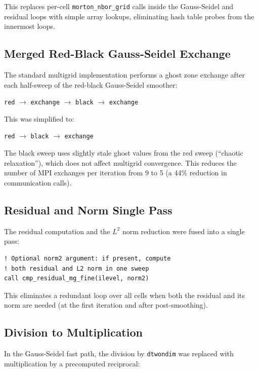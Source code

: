 \documentclass[11pt,fleqn]{book}
\begin{document}
This replaces per-cell \texttt{morton\_nbor\_grid} calls inside the Gauss-Seidel and residual loops with simple array lookups, eliminating hash table probes from the innermost loops.

\subsection{Merged Red-Black Gauss-Seidel Exchange}

The standard multigrid implementation performs a ghost zone exchange after each half-sweep of the red-black Gauss-Seidel smoother:
\begin{center}
\texttt{red} $\to$ \texttt{exchange} $\to$ \texttt{black} $\to$ \texttt{exchange}
\end{center}

This was simplified to:
\begin{center}
\texttt{red} $\to$ \texttt{black} $\to$ \texttt{exchange}
\end{center}

The black sweep uses slightly stale ghost values from the red sweep (``chaotic relaxation''), which does not affect multigrid convergence. This reduces the number of MPI exchanges per iteration from 9 to 5 (a 44\% reduction in communication calls).

\subsection{Residual and Norm Single Pass}

The residual computation and the $L^2$ norm reduction were fused into a single pass:

\begin{lstlisting}[style=fortran,numbers=none]
! Optional norm2 argument: if present, compute
! both residual and L2 norm in one sweep
call cmp_residual_mg_fine(ilevel, norm2)
\end{lstlisting}

This eliminates a redundant loop over all cells when both the residual and its norm are needed (at the first iteration and after post-smoothing).

\subsection{Division to Multiplication}

In the Gauss-Seidel fast path, the division by \texttt{dtwondim} was replaced with multiplication by a precomputed reciprocal:
\end{document}
